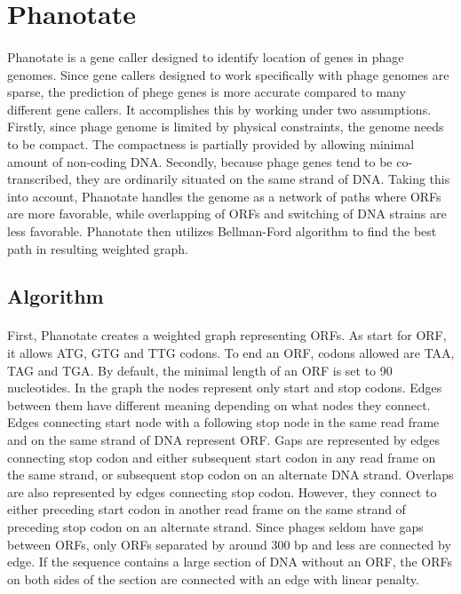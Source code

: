 \section{Phanotate}
\paragraph*{}
Phanotate is a gene caller designed to identify location of genes in phage genomes. Since gene callers designed to work specifically with phage genomes are sparse, the prediction of phege genes is more accurate compared to many different gene callers. It accomplishes this by working under two assumptions. Firstly, since phage genome is limited by physical constraints, the genome needs to be compact. The compactness is partially provided by allowing minimal amount of non-coding DNA. Secondly, because phage genes tend to be co-transcribed, they are ordinarily situated on the same strand of DNA. Taking this into account, Phanotate handles the genome as a network of paths where ORFs are more favorable, while overlapping of ORFs and switching of DNA strains are less favorable. Phanotate then utilizes Bellman-Ford algorithm to find the best path in resulting weighted graph.

\subsection{Algorithm}
\paragraph*{}
First, Phanotate creates a weighted graph representing ORFs. As start for ORF, it allows ATG, GTG and TTG codons. To end an ORF, codons allowed are TAA, TAG and TGA. By default, the minimal length of an ORF is set to 90 nucleotides. In the graph the nodes represent only start and stop codons. Edges between them have different meaning depending on what nodes they connect. Edges connecting start node with a following stop node in the same read frame and on the same strand of DNA represent ORF. Gaps are represented by edges connecting stop codon and either subsequent start codon in any read frame on the same strand, or subsequent stop codon on an alternate DNA strand. Overlaps are also represented by edges connecting stop codon. However, they connect to either preceding start codon in another read frame on the same strand of preceding stop codon on an alternate strand. Since phages seldom have gaps between ORFs, only ORFs separated by around 300 bp and less are connected by edge. If the sequence contains a large section of DNA without an ORF, the ORFs on both sides of the section are connected with an edge with linear penalty.
